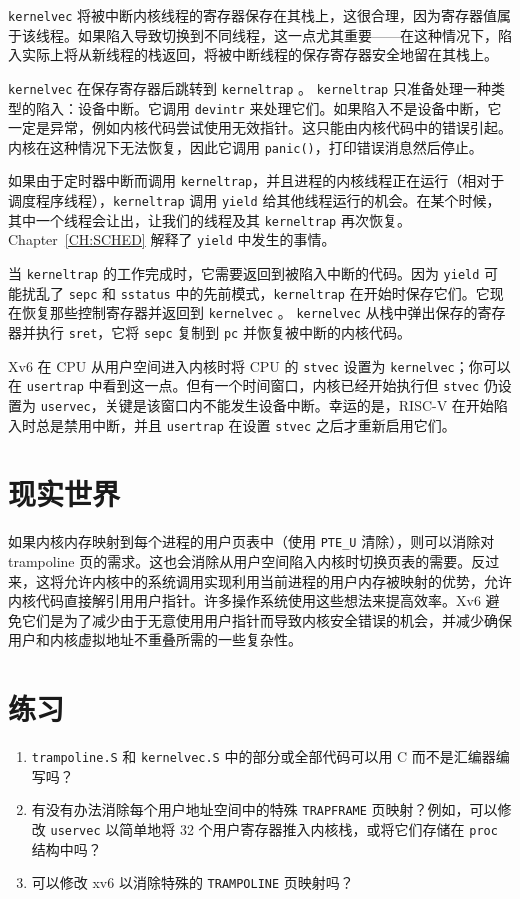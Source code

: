 {\tt kernelvec} 将被中断内核线程的寄存器保存在其栈上，这很合理，因为寄存器值属于该线程。如果陷入导致切换到不同线程，这一点尤其重要——在这种情况下，陷入实际上将从新线程的栈返回，将被中断线程的保存寄存器安全地留在其栈上。

{\tt kernelvec} 在保存寄存器后跳转到 {\tt kerneltrap}
。
{\tt kerneltrap} 只准备处理一种类型的陷入：设备中断。它调用 {\tt devintr}
来处理它们。如果陷入不是设备中断，它一定是异常，例如内核代码尝试使用无效指针。这只能由内核代码中的错误引起。内核在这种情况下无法恢复，因此它调用 {\tt panic()}，打印错误消息然后停止。

如果由于定时器中断而调用 {\tt kerneltrap}，并且进程的内核线程正在运行（相对于调度程序线程），{\tt kerneltrap} 调用 {\tt yield} 给其他线程运行的机会。在某个时候，其中一个线程会让出，让我们的线程及其 {\tt kerneltrap} 再次恢复。Chapter~\ref{CH:SCHED} 解释了 {\tt yield} 中发生的事情。

当 {\tt kerneltrap} 的工作完成时，它需要返回到被陷入中断的代码。因为 {\tt yield} 可能扰乱了 {\tt sepc} 和 {\tt sstatus} 中的先前模式，{\tt kerneltrap} 在开始时保存它们。它现在恢复那些控制寄存器并返回到 {\tt kernelvec}
。
{\tt kernelvec} 从栈中弹出保存的寄存器并执行 {\tt sret}，它将 {\tt sepc} 复制到 {\tt pc} 并恢复被中断的内核代码。

Xv6 在 CPU 从用户空间进入内核时将 CPU 的 {\tt stvec} 设置为 {\tt kernelvec}；你可以在 {\tt usertrap}
中看到这一点。但有一个时间窗口，内核已经开始执行但 {\tt stvec} 仍设置为 {\tt uservec}，关键是该窗口内不能发生设备中断。幸运的是，RISC-V 在开始陷入时总是禁用中断，并且 {\tt usertrap} 在设置 {\tt stvec} 之后才重新启用它们。

\section{现实世界}

如果内核内存映射到每个进程的用户页表中（使用 \lstinline{PTE_U} 清除），则可以消除对 trampoline 页的需求。这也会消除从用户空间陷入内核时切换页表的需要。反过来，这将允许内核中的系统调用实现利用当前进程的用户内存被映射的优势，允许内核代码直接解引用用户指针。许多操作系统使用这些想法来提高效率。Xv6 避免它们是为了减少由于无意使用用户指针而导致内核安全错误的机会，并减少确保用户和内核虚拟地址不重叠所需的一些复杂性。

\section{练习}

\begin{enumerate}

\item {\tt trampoline.S} 和 {\tt kernelvec.S} 中的部分或全部代码可以用 C 而不是汇编器编写吗？

\item 有没有办法消除每个用户地址空间中的特殊 {\tt TRAPFRAME} 页映射？例如，可以修改 {\tt uservec} 以简单地将 32 个用户寄存器推入内核栈，或将它们存储在 {\tt proc} 结构中吗？

\item 可以修改 xv6 以消除特殊的 {\tt TRAMPOLINE} 页映射吗？

\end{enumerate}
